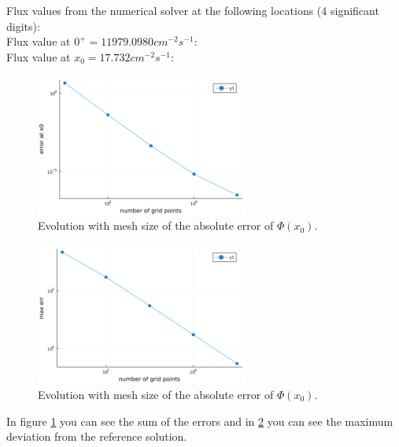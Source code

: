 \documentclass[11pt,a4paper]{article}
\begin{document}
Flux values from the numerical solver at the following locations (4 significant digits):\\
Flux value at $0^+ = 11979.0980 cm^{-2} s^{-1}$: \\
Flux value at $x_0 = 17.732 cm^{-2} s^{-1}$: \\


\begin{figure}[h]
\includegraphics[width=7cm]{../figs/ex1/err_x0.png}
\centering
\caption{Evolution with mesh size of the absolute error of $\Phi(x_0)$.}
\label{sumerr}
\end{figure}
\begin{figure}[h]
\includegraphics[width=7cm]{../figs/ex1/max_errors.png}
\centering
\caption{Evolution with mesh size of the absolute error of $\Phi(x_0)$.}
\label{maxerr}
\end{figure}

In figure \ref{sumerr} you can see the sum of the errors and in \ref{maxerr} you can see the maximum deviation from the reference solution.


\end{document}
